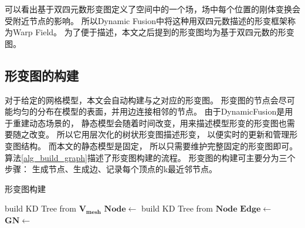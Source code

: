 可以看出基于双四元数形变图定义了空间中的一个场，场中每个位置的刚体变换会受附近节点的影响。
所以Dynamic Fusion中将这种用双四元数描述的形变框架称为Warp Field。
为了便于描述，本文之后提到的形变图均为基于双四元数的形变图。

\subsection{形变图的构建}  
对于给定的网格模型，本文会自动构建与之对应的形变图。
形变图的节点会尽可能均匀的分布在模型的表面，并用边连接相邻的节点。
由于DynamicFusion\cite{newcombe2015dynamicfusion}是用于重建动态场景的，
静态模型会随着时间改变，用来描述模型形变的形变图也需要随之改变。
所以它用层次化的树状形变图描述形变，
以便实时的更新和管理形变图结构。
而本文的静态模型是固定，
所以只需要维护完整固定的形变图即可。
算法\ref{alg_build_graph}描述了形变图构建的流程。
形变图的构建可主要分为三个步骤：
生成节点、生成边、记录每个顶点的k最近邻节点。
\begin{algorithm}
    \caption{形变图构建}
    \label{alg_build_graph}
    \begin{algorithmic}[1]
            \State build KD Tree from $\bm{V_{mesh}}$
            \State $\bm{Node} \gets$ 
            \State build KD Tree from $\bm{Node}$
            \State $\bm{Edge} \gets$ 
            \State $\bm{GN} \gets$ 
        \EndProcedure
    \end{algorithmic}
\end{algorithm} 

